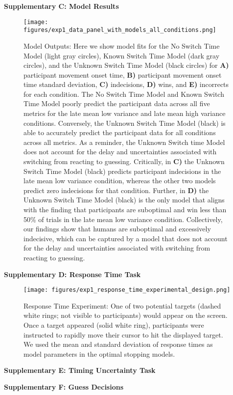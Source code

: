 \documentclass[12pt,letterpaper]{article}
\begin{document}
\noindent\textbf{\large\textcolor{mydarkblue}{Supplementary C: Model Results}}

\begin{figure}[H]
    \renewcommand\figurename{Supplementary Figure}

    \begin{minipage}[c]{0.64\textwidth}
        \texttt{[image: figures/exp1\_data\_panel\_with\_models\_all\_conditions.png]}
    \end{minipage}\hfill
    \begin{minipage}[c]{0.3\textwidth}
        \caption{
            Model Outputs: Here we show model fits for the No Switch Time Model (light gray circles), Known Switch Time Model (dark gray circles), and the Unknown Switch Time Model (black circles) for \textbf{A)} participant movement onset time, \textbf{B)} participant movement onset time standard deviation, \textbf{C)} indecisions, \textbf{D)} wins, and \textbf{E)} incorrects for each condition. The No Switch Time Model and Known Switch Time Model poorly predict the participant data across all five metrics for the late mean low variance and late mean high variance conditions. Conversely, the Unknown Switch Time Model (black) is able to accurately predict the participant data for all conditions across all metrics. As a reminder, the Unknown Switch time Model does not account for the delay and uncertainties associated with switching from reacting to guessing. Critically, in \textbf{C)} the Unknown Switch Time Model (black) predicts participant indecisions in the late mean low variance condition, whereas the other two models predict zero indecisions for that condition. Further, in \textbf{D)} the Unknown Switch Time Model (black) is the only model that aligns with the finding that participants are suboptimal and win less than 50\% of trials in the late mean low variance condition. Collectively, our findings show that humans are suboptimal and excessively indecisive, which can be captured by a model that does not account  for the delay and uncertainties associated with switching from reacting to guessing.
        } 
    \end{minipage}
\end{figure}


\noindent\textbf{\large\textcolor{mydarkblue}{Supplementary D: Response Time Task}}
\begin{figure}[H]
    \centering
    \texttt{[image: figures/exp1\_response\_time\_experimental\_design.png]}

    \caption{Response Time Experiment: One of two potential targets (dashed white rings; not visible to participants) would appear on the screen. Once a target appeared (solid white ring), participants were instructed to rapidly move their cursor to hit the displayed target. We used the mean and standard deviation of response times as model parameters in the optimal stopping models.}
\end{figure}

\noindent\textbf{\large\textcolor{mydarkblue}{Supplementary E: Timing Uncertainty Task}}


\noindent\textbf{\large\textcolor{mydarkblue}{Supplementary F: Guess Decisions}}
\end{document}
